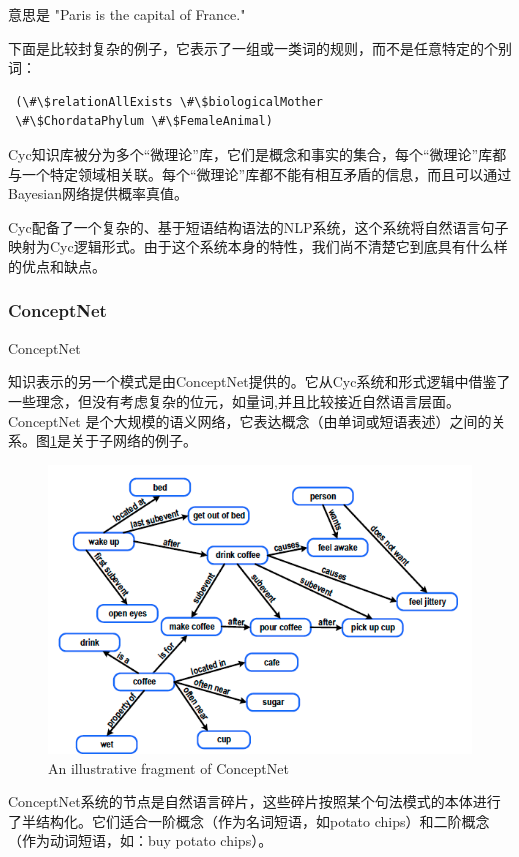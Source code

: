 \noindent 意思是 "Paris is the capital of France."


下面是比较封复杂的例子，它表示了一组或一类词的规则，而不是任意特定的个别词：

 {\tt\begin{small}\begin{lstlisting}
 (\#\$relationAllExists \#\$biologicalMother 
 \#\$ChordataPhylum \#\$FemaleAnimal)
    \end{lstlisting}\end{small}}
    

Cyc知识库被分为多个“微理论”库，它们是概念和事实的集合，每个“微理论”库都与一个特定领域相关联。每个“微理论”库都不能有相互矛盾的信息，而且可以通过Bayesian网络提供概率真值。

Cyc配备了一个复杂的、基于短语结构语法的NLP系统，这个系统将自然语言句子映射为Cyc逻辑形式。由于这个系统本身的特性，我们尚不清楚它到底具有什么样的优点和缺点。


\subsubsection{ConceptNet}{ConceptNet}

知识表示的另一个模式是由ConceptNet提供的\cite{Liu2004}。它从Cyc系统和形式逻辑中借鉴了一些理念，但没有考虑复杂的位元，如量词,并且比较接近自然语言层面。ConceptNet 是个大规模的语义网络，它表达概念（由单词或短语表述）之间的关系。图\ref{fig:concept}是关于子网络的例子。

\begin{figure}[htb]
\centering
\includegraphics[width=12cm]{figures/conceptnet.png}
\caption{ An illustrative fragment of ConceptNet }
\label{fig:concept}
\end{figure}

ConceptNet系统的节点是自然语言碎片，这些碎片按照某个句法模式的本体进行了半结构化。它们适合一阶概念（作为名词短语，如potato chips）和二阶概念（作为动词短语，如：buy potato chips）。

